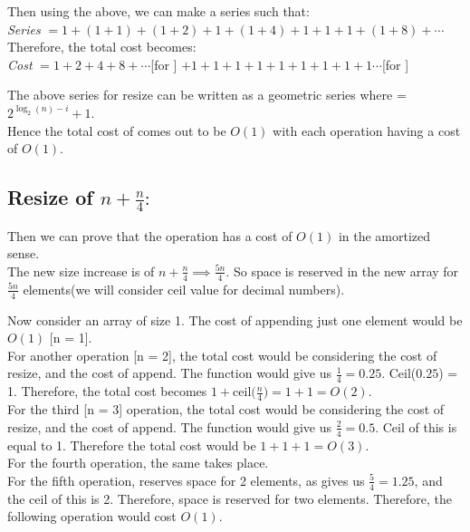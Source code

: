 \documentclass[addpoints]{exam}
\begin{document}
\begin{questions}
\begin{solution}
    Then using the above, we can make a series such that: \\ 
    \textit{Series} $ = 1 + (1 + 1) + (1 + 2) + 1 + (1 + 4) + 1 + 1 + 1 + (1 + 8) + \cdots $ \\ 
    Therefore, the total cost becomes: \\ 
    \textit{Cost} $ = 1 + 2 + 4 + 8 + \cdots $[for ] $ + 1 + 1 + 1 + 1 + 1 + 1 + 1 + 1 + 1 \cdots $[for ]


    \vspace{2mm}
    The above series for resize can be written as a geometric series where  = $ 2^{\log_2(n) - i} + 1 $. \\ Hence the total cost of  comes out to be $O(1)$ with each  operation having a cost of $O(1)$.

    \subsection*{Resize of $ n + \frac{n}{4} :$}
    Then we can prove that the  operation has a cost of $O(1)$ in the amortized sense. \\ 
    The new size increase is of $ n + \frac{n}{4} \implies \frac{5n}{4} $. So space is reserved in the new array for $ \frac{5n}{4} $ elements(we will consider ceil value for decimal numbers). 

    Now consider an array of size 1. The cost of appending just one element would be $ O(1) $ [n = 1]. \\ 
    For another  operation [n = 2], the total cost would be considering the cost of resize, and the cost of append. The  function would give us $ \frac{1}{4} = 0.25$. Ceil($0.25$) = 1. Therefore, the total cost becomes $ 1 + \text{ceil($\frac{n}{4}$)} = 1 + 1 = O(2)$. \\ 
    For the third  [n = 3] operation, the total cost would be considering the cost of resize, and the cost of append. The  function would give us $ \frac{2}{4} = 0.5 $. Ceil of this is equal to 1. Therefore the total cost would be $ 1 + 1 + 1 = O(3) $. \\ 
    For the fourth  operation, the same takes place. \\ 
    For the fifth  operation,  reserves space for 2 elements, as  gives us $ \frac{5}{4} = 1.25 $, and the ceil of this is 2. Therefore, space is reserved for two elements. Therefore, the following  operation would cost $ O(1) $.


\end{solution}
\end{questions}
\end{document}
